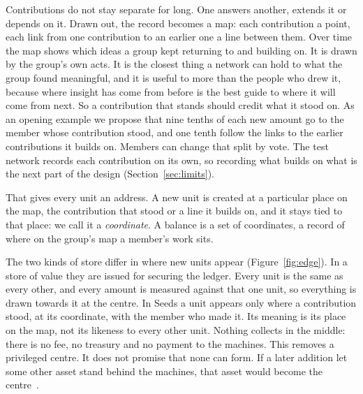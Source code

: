 \documentclass[11pt,a4paper]{article}
\begin{document}
Contributions do not stay separate for long. One answers another, extends it or depends on it. Drawn out, the record becomes a map: each contribution a point, each link from one contribution to an earlier one a line between them. Over time the map shows which ideas a group kept returning to and building on. It is drawn by the group's own acts. It is the closest thing a network can hold to what the group found meaningful, and it is useful to more than the people who drew it, because where insight has come from before is the best guide to where it will come from next. So a contribution that stands should credit what it stood on. As an opening example we propose that nine tenths of each new amount go to the member whose contribution stood, and one tenth follow the links to the earlier contributions it builds on. Members can change that split by vote. The test network records each contribution on its own, so recording what builds on what is the next part of the design (Section~\ref{sec:limits}).

That gives every unit an address. A new unit is created at a particular place on the map, the contribution that stood or a line it builds on, and it stays tied to that place: we call it a \emph{coordinate}. A balance is a set of coordinates, a record of where on the group's map a member's work sits.

The two kinds of store differ in where new units appear (Figure~\ref{fig:edge}). In a store of value they are issued for securing the ledger. Every unit is the same as every other, and every amount is measured against that one unit, so everything is drawn towards it at the centre. In Seeds a unit appears only where a contribution stood, at its coordinate, with the member who made it. Its meaning is its place on the map, not its likeness to every other unit. Nothing collects in the middle: there is no fee, no treasury and no payment to the machines. This removes a privileged centre. It does not promise that none can form. If a later addition let some other asset stand behind the machines, that asset would become the centre~\cite{anotherway}.
\end{document}
